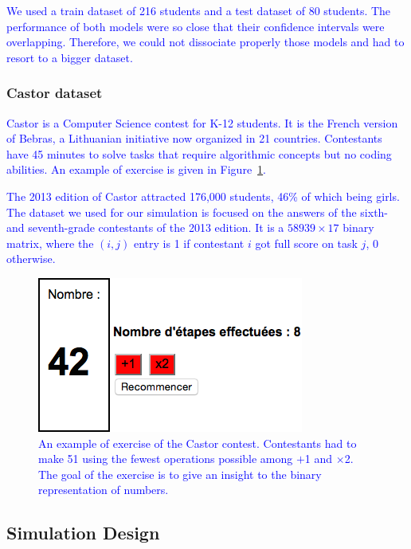\documentclass{sig-alternate}
\newcommand\note[1]{\textcolor{blue}{#1}}
\begin{document}
\note{We used a train dataset of 216 students and a test dataset of 80 students. The performance of both models were so close that their confidence intervals were overlapping. Therefore, we could not dissociate properly those models and had to resort to a bigger dataset.} %

\subsubsection{Castor dataset}

\note{Castor is a Computer Science contest for K-12 students. It is the French version of Bebras, a Lithuanian initiative now organized in 21 countries. Contestants have 45 minutes to solve tasks that require algorithmic concepts but no coding abilities. An example of exercise is given in Figure~\ref{fig:51}.}

\note{The 2013 edition of Castor attracted 176,000 students, 46\% of which being girls. The dataset we used for our simulation is focused on the answers of the sixth- and seventh-grade contestants of the 2013 edition. It is a $58939 \times 17$ binary matrix, where the $(i, j)$ entry is 1 if contestant $i$ got full score on task $j$, 0 otherwise.}

\begin{figure}
\includegraphics[width=\linewidth]{51-calc}
\caption{\note{An example of exercise of the Castor contest. Contestants had to make 51 using the fewest operations possible among $+$1 and $\times$2. The goal of the exercise is to give an insight to the binary representation of numbers.}}
\label{fig:51}
\end{figure}

\subsection{Simulation Design}
\end{document}
